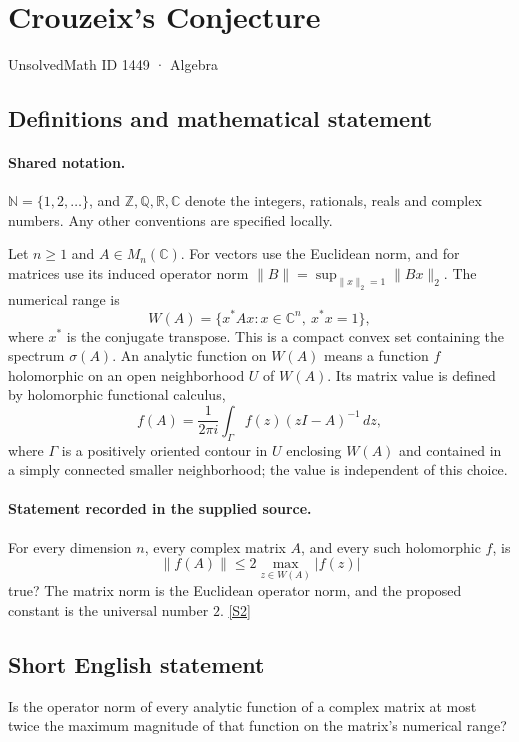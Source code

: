 \documentclass[11pt]{article}
\newcommand{\sref}[2]{\hyperlink{source:#1:#2}{[S#2]}}
\begin{document}
\setcounter{section}{1448}
\section{Crouzeix's Conjecture}\label{1449}
{\small\sffamily UnsolvedMath ID 1449 · Algebra}
\subsection{Definitions and mathematical statement}

\paragraph{Shared notation.}$\mathbb N=\{1,2,\ldots\}$, and $\mathbb Z,\mathbb Q,\mathbb R,\mathbb C$ denote the integers, rationals, reals and complex numbers. Any other conventions are specified locally.


Let $n\ge1$ and $A\in M_n(\mathbb C)$. For vectors use the Euclidean norm, and for matrices use its induced operator norm $\|B\|=\sup_{\|x\|_2=1}\|Bx\|_2$. The numerical range is
\[
 W(A)=\{x^*Ax:x\in\mathbb C^n,\ x^*x=1\},
\]
where $x^*$ is the conjugate transpose. This is a compact convex set containing the spectrum $\sigma(A)$. An analytic function on $W(A)$ means a function $f$ holomorphic on an open neighborhood $U$ of $W(A)$. Its matrix value is defined by holomorphic functional calculus,
\[
 f(A)=\frac1{2\pi i}\int_\Gamma f(z)(zI-A)^{-1}\,dz,
\]
where $\Gamma$ is a positively oriented contour in $U$ enclosing $W(A)$ and contained in a simply connected smaller neighborhood; the value is independent of this choice.
\paragraph{Statement recorded in the supplied source.}
For every dimension $n$, every complex matrix $A$, and every such holomorphic $f$, is
\[
 \|f(A)\|\le2\max_{z\in W(A)}|f(z)|
\]
true? The matrix norm is the Euclidean operator norm, and the proposed constant is the universal number $2$. \sref{1449}{2}
\subsection{Short English statement}
Is the operator norm of every analytic function of a complex matrix at most twice the maximum magnitude of that function on the matrix’s numerical range?
\end{document}

